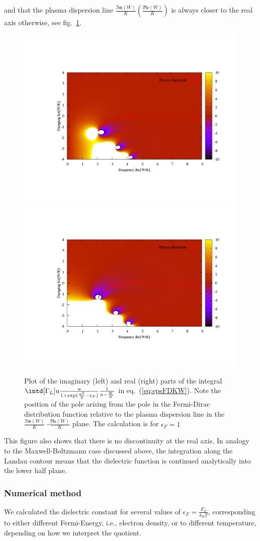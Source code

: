 \documentclass[physics,phd,nolot,nolof]{uccthesis}%
\begin{document}
and that the plasma dispersion line 
$\frac{\mathfrak{Im}(W)}{K}(\frac{\mathfrak{Re}(W)}{K})$ is always closer to the real axis otherwise, see fig.~\ref{fig:FDpoles}.
\begin{figure}[h]
	\begin{center}
	\includegraphics[width=.5\textwidth]{pole.png}%
	\includegraphics[width=.5\textwidth]{pole2.png}
	\end{center}
	\caption{Plot of the imaginary (left) and real (right) parts of the integral $\intd[\Gamma_L]u \frac{u}{1+\text{exp}(\frac{u^2}{2}-\epsilon_F)} \frac{1}{u-\frac{W}{K}}$ in eq.~(\ref{eq:epsFDKW}).
	Note the position of the pole arising from the pole in the Fermi-Dirac distribution function relative to the plasma dispersion line in the $\frac{\mathfrak{Im}(W)}{K}$ -$\frac{\mathfrak{Re}(W)}{K}$ plane. The calculation is for $\epsilon_F=1$}
	\label{fig:FDpoles}
\end{figure}
This figure also shows that there is no discontinuity at the real axis. In analogy to the Maxwell-Boltzmann case discussed above, the integration along the Landau contour means that the dielectric function is continued analytically into the lower half plane.
\subsubsection{Numerical method}
We calculated the dielectric constant for several values of $\epsilon_F=\frac{E_F}{k_BT}$, corresponding to either different Fermi-Energy, i.e., electron density, or to different temperature, depending on how we interpret the quotient.
\end{document}

